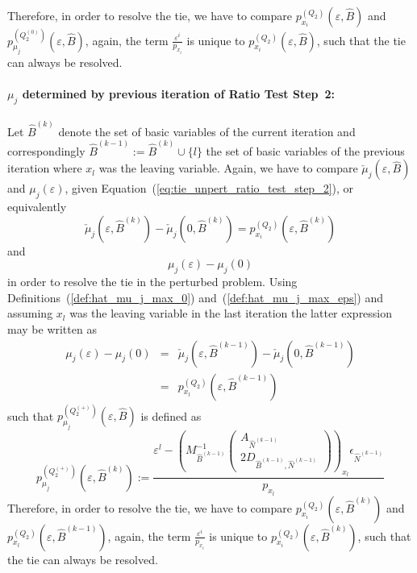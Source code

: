 \documentclass[a4paper]{article}
\newcommand{\pmu}[2]{\ensuremath{p_{\mu_{j}}^{(#1)}(\varepsilon, #2)}}
\begin{document}
Therefore, in order to resolve the tie, we have to compare
$p_{x_{i}}^{(Q_{2})}(\varepsilon, \hat{B})$ and
\pmu{Q_{2}^{(0)}}{\hat{B}}, again,
the term $\frac{\varepsilon^{i}}{p_{x_{i}}}$ is unique to
$p_{x_{i}}^{(Q_{2})}(\varepsilon, \hat{B})$, such that the tie can
always be resolved.

\paragraph{$\mu_{j}$ determined by previous iteration of Ratio Test Step~2:}
Let $\hat{B}^{(k)}$ denote
the set of basic variables of the current iteration and correspondingly
$\hat{B}^{(k-1)}:=\hat{B}^{(k)} \cup \{l\}$ the set of basic variables of the
previous iteration where $x_{l}$ was the leaving variable.
Again, we have to compare $\check{\mu}_{j}(\varepsilon, \hat{B})$ and
$\mu_{j}(\varepsilon)$, given Equation~(\ref{eq:tie_unpert_ratio_test_step_2}),
or equivalently
\begin{equation*}
  \check{\mu}_{j}(\varepsilon, \hat{B}^{(k)}) -
  \check{\mu}_{j}(0, \hat{B}^{(k)})=
  p_{x_{i}}^{(Q_{2})}(\varepsilon, \hat{B}^{(k)})
\end{equation*}
and
\begin{equation*}
\mu_{j}\left(\varepsilon\right) - \mu_{j}\left(0\right)
\end{equation*}
in order to resolve the tie in the perturbed problem.
Using Definitions~(\ref{def:hat_mu_j_max_0}) and~(\ref{def:hat_mu_j_max_eps})
and assuming $x_{l}$ was the leaving variable in the last iteration the
latter expression may be written as
\begin{eqnarray}
\mu_{j}\left(\varepsilon\right) - \mu_{j}\left(0\right)
&=&
\check{\mu}_{j}(\varepsilon, \hat{B}^{(k-1)})
-\check{\mu}_{j}(0, \hat{B}^{(k-1)})
\nonumber \\
&=&
p_{x_{l}}^{(Q_{2})}(\varepsilon, \hat{B}^{(k-1)})
\nonumber
\end{eqnarray}
such that \pmu{Q_{2}^{(+)}}{\hat{B}} is defined as
\begin{equation}
\label{def:p_mu_j_Q_2_+}
\pmu{Q_{2}^{(+)}}{\hat{B}^{(k)}} :=
  \frac{\varepsilon^{l} -
         \left(M_{\hat{B}^{(k-1)}}^{-1}
           \left(\begin{array}{c}
                    A_{\hat{N}^{(k-1)}}  \\
	            \hline
	            2D_{\hat{B}^{(k-1)}, \hat{N}^{(k-1)}}
	         \end{array}
	   \right)
         \right)_{x_{l}}\epsilon_{\hat{N}^{(k-1)}}}{p_{x_{l}}}
\end{equation}
Therefore, in order to resolve the tie, we have to compare
$p_{x_{i}}^{(Q_{2})}(\varepsilon, \hat{B}^{(k)})$ and
$p_{x_{l}}^{(Q_{2})}(\varepsilon, \hat{B}^{(k-1)})$, again,
the term $\frac{\varepsilon^{i}}{p_{x_{i}}}$ is unique to
$p_{x_{i}}^{(Q_{2})}(\varepsilon, \hat{B}^{(k)})$, such that the tie can
always be resolved. 
\end{document}
